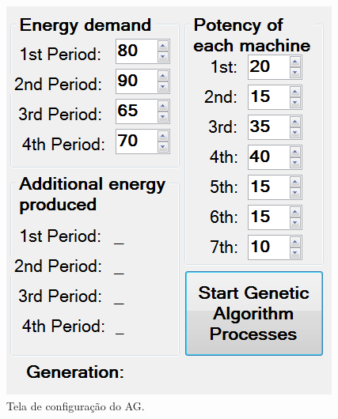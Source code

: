 \documentclass[twoside]{article}
\begin{document}
\begin{multicols}{2}
\begin{figure}[H]
\label{fig:interface}
  \caption{Tela de configuração do AG.}
  \centering
    \includegraphics[scale = 0.6]{interface_config.png}
\end{figure}


\end{multicols}
\end{document}
